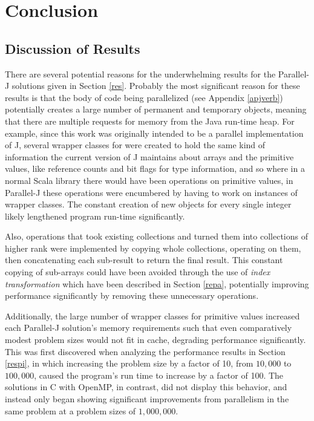 \chapter{Conclusion}
\label{conc}

\section{Discussion of Results}
\label{discres}
There are several potential reasons for the underwhelming results for the Parallel-J solutions given in Section \ref{res}. 
Probably the most significant reason for these results is that the body of code being parallelized (see Appendix \ref{apjverb}) 
potentially creates a large number of permanent and temporary objects, 
meaning that there are multiple requests for memory from the Java run-time heap. 
For example, since this work was originally intended to be a parallel implementation of J, 
several wrapper classes for were created to hold the same kind of information the current version of J\cite{ioj} 
maintains about arrays and the primitive values, like reference counts and bit flags for type information, 
and so where in a normal Scala library there would have been operations on primitive values, 
in Parallel-J these operations were encumbered by having to work on instances of wrapper classes. 
The constant creation of new objects for every single integer likely lengthened program run-time significantly.

Also, operations that took existing collections and turned them into collections of higher rank 
were implemented by copying whole collections, operating on them, 
then concatenating each sub-result to return the final result. 
This constant copying of sub-arrays could have been avoided through the use of \textit{index transformation} 
which have been described in Section \ref{repa}, potentially improving performance significantly 
by removing these unnecessary operations.
 
Additionally, the large number of wrapper classes for primitive values 
increased each Parallel-J solution's memory requirements such that even comparatively modest problem sizes
would not fit in cache, degrading performance significantly. 
This was first discovered when analyzing the performance results in Section \ref{respi}, 
in which increasing the problem size by a factor of 10, from $10,000$ to $100,000$, 
caused the program's run time to increase by a factor of 100. 
The solutions in C with OpenMP, in contrast, did not display this behavior, 
and instead only began showing significant improvements from parallelism in the same problem 
at a problem sizes of $1,000,000$.

